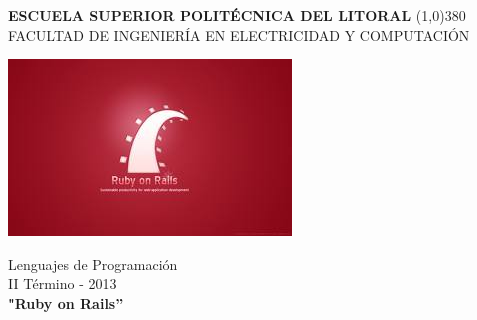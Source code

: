 \documentclass[a4paper,11pt]{article}
\begin{document}
\setlength{\topmargin}{-0,2in}


\vspace*{\fill}
			\begin{center}
				\textbf{
					\vspace{-0.7em}
					ESCUELA SUPERIOR POLITÉCNICA DEL LITORAL
				}
				\line(1,0){380}\\		
				\scriptsize{FACULTAD DE INGENIERÍA EN ELECTRICIDAD Y COMPUTACIÓN}
				
				\vspace{2.5em}
				\includegraphics[scale=0.5]{imagenes/ruby.jpg} 
			\end{center}
			
			\begin{center}
				\vspace{2.5em}
				Lenguajes de Programación
				\\II Término - 2013\\
				\vspace{3.5em}  %
				\textbf{"Ruby on Rails''}
				\vspace{5em}
			\end{center}	

\vspace*{\fill}
\newpage 

\tableofcontents

\newpage

\end{document}
